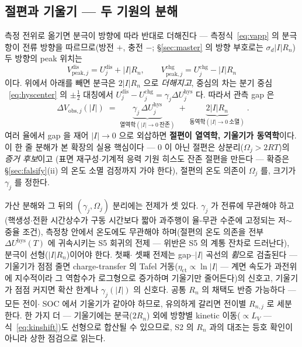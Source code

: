 \documentclass[11pt,a4paper]{article}
\newcommand{\peak}{\mathrm{peak}}
\newcommand{\dis}{\mathrm{dis}}
\newcommand{\chg}{\mathrm{chg}}
\newcommand{\hys}{\mathrm{hys}}
\newcommand{\obs}{\mathrm{obs}}
\begin{document}
\subsection{절편과 기울기 — 두 기원의 분해}
측정 전위로 옮기면 분극이 방향에 따라 반대로 더해진다 — 측정식~\eqref{eq:vapp} 의 분극 항이 전류
방향을 따르므로(방전 $+$, 충전 $-$; \S\ref{sec:master} 의 방향 부호로는 $\sigma_d|I|R_n$) 두 방향의
peak 위치는
\begin{equation}
V_{\peak,j}^{\dis}=U_j^{\dis}+|I|R_n,\qquad
V_{\peak,j}^{\chg}=U_j^{\chg}-|I|R_n
\label{eq:hyspeakpos}
\end{equation}
이다. 위에서 아래를 빼면 분극은 $2|I|R_n$ 으로 \emph{더해지고}, 중심의 차는 분기 중심
~\eqref{eq:hyscenter} 의 $\pm\tfrac12$ 대칭에서 $U_j^{\dis}-U_j^{\chg}=\gamma_j\Delta U_j^\hys$
다. 따라서 관측 gap 은
\begin{equation}
\boxed{\;\Delta V_{\obs,j}(|I|)\;=\;
\underbrace{\gamma_j\,\Delta U_j^\hys}_{\text{열역학}(|I|\to0\ \text{잔존})}
\;+\;\underbrace{2|I|R_n}_{\text{동역학}(|I|\to0\ \text{소멸})}\;.}
\label{eq:hysobsgap}
\end{equation}
여러 율에서 gap 을 재어 $|I|\to0$ 으로 외삽하면 \textbf{절편이 열역학, 기울기가 동역학}이다. 이 한 줄
분해가 본 확장의 실용 핵심이다 — $0$ 이 아닌 절편은 상분리($\Omega_j>2RT$)의 \emph{증거 후보}이고
(표면 재구성$\cdot$기계적 응력 기원 히스도 잔존 절편을 만든다 — 확증은 \S\ref{sec:falsify}(ii) 의
온도 소멸 검정까지 가야 한다), 절편의 온도 의존이 $\Omega_j$ 를, 크기가 $\gamma_j$ 를 정한다.

가산 분해와 그 뒤의 $(\gamma_j,\Omega_j)$ 분리에는 전제가 셋 있다. $\gamma_j$ 가 전류에 무관해야
하고(핵생성$\cdot$전환 시간상수가 구동 시간보다 짧아 과주행이 율-무관 수준에 고정되는 저$\sim$중율
조건), 측정창 안에서 온도에도 무관해야 하며(절편의 온도 의존을 전부 $\Delta U^\hys(T)$ 에 귀속시키는
S5 회귀의 전제 — 위반은 S5 의 계통 잔차로 드러난다), 분극이 선형($|I|R_n$)이어야 한다. 첫째$\cdot$
셋째 전제는 gap--$|I|$ 곡선의 \emph{휨}으로 검출된다 — 기울기가 점점 줄면 charge-transfer 의 Tafel 거동($\eta_{\mathrm{ct}}\propto\ln|I|$ — 계면
속도가 과전위에 지수적이라 그 역함수가 로그형으로 증가하며 기울기만 줄어든다)의 신호고, 기울기가 점점
커지면 확산 한계나 $\gamma_j(|I|)$ 의 신호다. 공통 $R_n$ 의 채택도 반증 가능하다 — 모든 전이$\cdot$
SOC 에서 기울기가 같아야 하므로, 유의하게 갈리면 전이별 $R_{n,j}$ 로 세분한다. 한 가지 더 — 기울기에는
분극($2R_n$) 외에 방향별 kinetic 이동($\propto L_V$ — 식~\eqref{eq:kinshift})도 선형으로 합산될
수 있으므로, S2 의 $R_n$ 과의 대조는 등호 확인이 아니라 상한 점검으로 읽는다.
\end{document}
